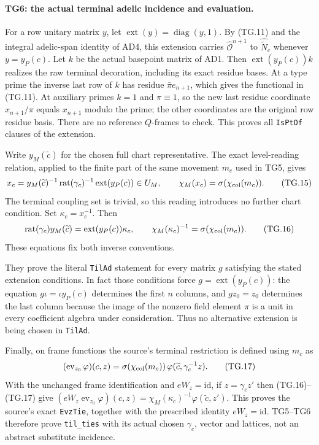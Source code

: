 \paragraph{TG6: the actual terminal adelic incidence and evaluation.}
For a row unitary matrix $y$, let
$\operatorname{ext}(y)=\operatorname{diag}(y,1)$. By (TG.11)
and the integral adelic-span identity of AD4, this extension
carries $\widehat{\mathcal O}^{n+1}$ to
$\widehat{\widetilde N}_c$ whenever $y=y_P(c)$.
Let $k$ be the actual basepoint matrix of AD1. Then
$\operatorname{ext}(y_P(c))k$ realizes the raw terminal
decoration, including its exact residue bases. At a type prime
the inverse last row of $k$ has residue
$\bar\pi e_{n+1}$, which gives the functional in (TG.11).
At auxiliary primes $k=1$ and $\pi\equiv1$, so the new last
residue coordinate $x_{n+1}/\pi$ equals $x_{n+1}$ modulo the
prime; the other coordinates are the original row residue basis.
There are no reference $Q$-frames to check. This proves all
\texttt{IsPtOf} clauses of the extension.

Write $y_M(\widetilde c)$ for the chosen full chart representative.
The exact level-reading relation, applied to the finite part of
the same movement $m_c$ used in TG5, gives
\[
 x_c=y_M(\widetilde c)^{-1}
       \operatorname{rat}(\gamma_c)^{-1}
       \operatorname{ext}(y_P(c))\in U_M,
 \qquad \chi_M(x_c)=\sigma(\chi_{\rm col}(m_c)).
 \tag{TG.15}
\]
The terminal coupling set is trivial, so this reading introduces
no further chart condition. Set $\kappa_c=x_c^{-1}$. Then
\[
 \operatorname{rat}(\gamma_c)y_M(\widetilde c)
       =\operatorname{ext}(y_P(c))\kappa_c,
 \qquad
 \chi_M(\kappa_c)^{-1}=\sigma(\chi_{\rm col}(m_c)).
 \tag{TG.16}
\]
These equations fix both inverse conventions.

They prove the literal \texttt{TilAd} statement for every matrix
$g$ satisfying the stated extension conditions. In fact those
conditions force $g=\operatorname{ext}(y_P(c))$: the equation
$g\iota=\iota y_P(c)$ determines the first $n$ columns, and
$g z_0=z_0$ determines the last column because the image of
the nonzero field element $\pi$ is a unit in every coefficient
algebra under consideration. Thus no alternative extension is
being chosen in \texttt{TilAd}.

Finally, on frame functions the source's terminal restriction is
defined using $m_c$ as
\[
 (\operatorname{ev}_{z_0}\varphi)(c,z)
  =\sigma(\chi_{\rm col}(m_c))\,
           \varphi(\widetilde c,\gamma_c^{-1}z).
 \tag{TG.17}
\]
With the unchanged frame identification and $eW_z=\mathrm{id}$,
if $z=\gamma_c z'$ then (TG.16)--(TG.17) give
$(eW_z\operatorname{ev}_{z_0}\varphi)(c,z)
=\chi_M(\kappa_c)^{-1}\varphi(\widetilde c,z')$.
This proves the source's exact \texttt{EvzTie}, together with
the prescribed identity $eW_z=\mathrm{id}$. TG5--TG6 therefore
prove \texttt{til\_ties} with its actual chosen $\gamma_c$,
vector and lattices, not an abstract substitute incidence.

